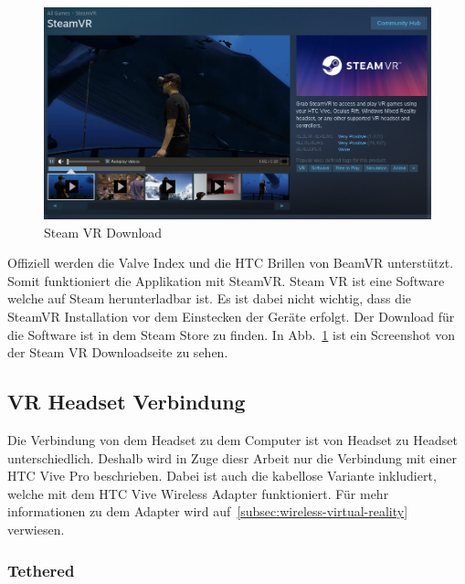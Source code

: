 \begin{figure}
    \centering
    \includegraphics[scale=0.4]{pics/steam-vr-in-store}
    \caption{Steam VR Download}
    \label{fig:steam-vr-in-store}
\end{figure}

Offiziell werden die Valve Index und die HTC Brillen von BeamVR unterstützt.
Somit funktioniert die Applikation mit SteamVR.
Steam VR ist eine Software welche auf Steam herunterladbar ist.
Es ist dabei nicht wichtig, dass die SteamVR Installation vor dem Einstecken der Geräte erfolgt.
Der Download für die Software ist in dem Steam Store zu finden.
In Abb.~\ref{fig:steam-vr-in-store} ist ein Screenshot von der Steam VR Downloadseite zu sehen.

\subsection{VR Headset Verbindung}

Die Verbindung von dem Headset zu dem Computer ist von Headset zu Headset unterschiedlich.
Deshalb wird in Zuge diesr Arbeit nur die Verbindung mit einer HTC Vive Pro beschrieben.
Dabei ist auch die kabellose Variante inkludiert, welche mit dem HTC Vive Wireless Adapter funktioniert.
Für mehr informationen zu dem Adapter wird auf~\ref{subsec:wireless-virtual-reality} verwiesen.

\subsubsection{Tethered}

